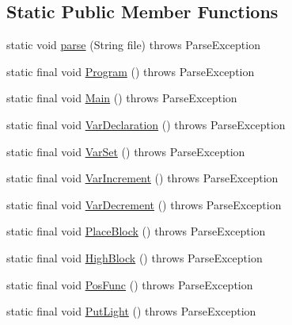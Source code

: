 \subsection*{Static Public Member Functions}
\begin{DoxyCompactItemize}
\item 
static void \mbox{\hyperlink{classorg_1_1tec_1_1comp_1_1interpreter_1_1_lang_parser_a26861644cef326306fff5a5f0d5b340c}{parse}} (String file)  throws Parse\+Exception 
\item 
static final void \mbox{\hyperlink{classorg_1_1tec_1_1comp_1_1interpreter_1_1_lang_parser_ac60c8b1eb82ca7b050c736d4b26a7248}{Program}} ()  throws Parse\+Exception 
\item 
static final void \mbox{\hyperlink{classorg_1_1tec_1_1comp_1_1interpreter_1_1_lang_parser_abeb1d03b1bf2be12cbfaa977f9596d83}{Main}} ()  throws Parse\+Exception 
\item 
static final void \mbox{\hyperlink{classorg_1_1tec_1_1comp_1_1interpreter_1_1_lang_parser_a862412f8210a05847254782c7fe1b353}{Var\+Declaration}} ()  throws Parse\+Exception 
\item 
static final void \mbox{\hyperlink{classorg_1_1tec_1_1comp_1_1interpreter_1_1_lang_parser_a71a7a9b93a5f234d50ab3aad85587c2a}{Var\+Set}} ()  throws Parse\+Exception 
\item 
static final void \mbox{\hyperlink{classorg_1_1tec_1_1comp_1_1interpreter_1_1_lang_parser_a5aaf17ddb60c9b4b2b2fe2dd6667a1b7}{Var\+Increment}} ()  throws Parse\+Exception 
\item 
static final void \mbox{\hyperlink{classorg_1_1tec_1_1comp_1_1interpreter_1_1_lang_parser_aa7496ab72f867ad38f60e357d2d7ed78}{Var\+Decrement}} ()  throws Parse\+Exception 
\item 
static final void \mbox{\hyperlink{classorg_1_1tec_1_1comp_1_1interpreter_1_1_lang_parser_aba5f35f67e90d5abe921230b7992f5e6}{Place\+Block}} ()  throws Parse\+Exception 
\item 
static final void \mbox{\hyperlink{classorg_1_1tec_1_1comp_1_1interpreter_1_1_lang_parser_a47c719b70d38e1b2cda82b4ba337884c}{High\+Block}} ()  throws Parse\+Exception 
\item 
static final void \mbox{\hyperlink{classorg_1_1tec_1_1comp_1_1interpreter_1_1_lang_parser_ac300dbf10ea115f311295874ba49b070}{Pos\+Func}} ()  throws Parse\+Exception 
\item 
static final void \mbox{\hyperlink{classorg_1_1tec_1_1comp_1_1interpreter_1_1_lang_parser_af49f420bd5143bc452553927c7335cd4}{Put\+Light}} ()  throws Parse\+Exception 

\end{DoxyCompactItemize}
